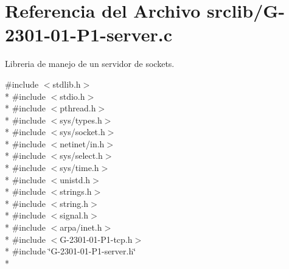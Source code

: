 \hypertarget{G-2301-01-P1-server_8c}{}\section{Referencia del Archivo srclib/\+G-\/2301-\/01-\/\+P1-\/server.c}
\label{G-2301-01-P1-server_8c}


Libreria de manejo de un servidor de sockets.  


{\ttfamily \#include $<$stdlib.\+h$>$}\\*
{\ttfamily \#include $<$stdio.\+h$>$}\\*
{\ttfamily \#include $<$pthread.\+h$>$}\\*
{\ttfamily \#include $<$sys/types.\+h$>$}\\*
{\ttfamily \#include $<$sys/socket.\+h$>$}\\*
{\ttfamily \#include $<$netinet/in.\+h$>$}\\*
{\ttfamily \#include $<$sys/select.\+h$>$}\\*
{\ttfamily \#include $<$sys/time.\+h$>$}\\*
{\ttfamily \#include $<$unistd.\+h$>$}\\*
{\ttfamily \#include $<$strings.\+h$>$}\\*
{\ttfamily \#include $<$string.\+h$>$}\\*
{\ttfamily \#include $<$signal.\+h$>$}\\*
{\ttfamily \#include $<$arpa/inet.\+h$>$}\\*
{\ttfamily \#include $<$G-\/2301-\/01-\/\+P1-\/tcp.\+h$>$}\\*
{\ttfamily \#include \char`\"{}G-\/2301-\/01-\/\+P1-\/server.\+h\char`\"{}}\\*
